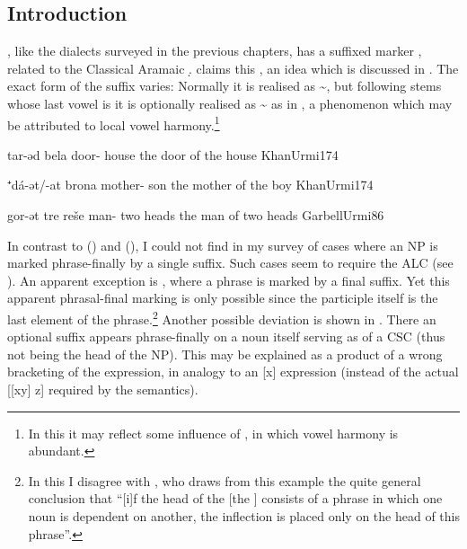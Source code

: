 \subsection{Introduction}
\JUrm, like the  dialects surveyed in the previous chapters, has a suffixed \cst* marker \ed, related to the Classical Aramaic \lnk* \d. \citet[171]{Garbell1965impact} claims this , an idea which is discussed in .   The exact form of the suffix varies: Normally it is realised as \~, but following stems whose last vowel is  it is optionally realised as \~ as in  \citep[174]{KhanUrmi}, a phenomenon which may be attributed to local vowel harmony.\footnote{In this it may reflect some influence of , in which vowel harmony is abundant.}

{tar-əd bela}
{door-\cst{} house}
{the door of the house}
{KhanUrmi}{174}

{⁺dá-ət/-at brona} 
{mother-\cst{} son}
{the mother of the boy}
{KhanUrmi}{174}

{gor-ət tre reše}
{man-\cst{} two heads}
{the man of two heads}
{GarbellUrmi}{86}

In contrast to \JZax () and \Qar (), I could not find in my survey of \JUrm  cases where an NP is marked phrase-finally by a single \ed suffix. Such cases seem to require the ALC (see ). An apparent exception is , where a  phrase is marked by a final \ed suffix. Yet this apparent phrasal-final marking is only possible since the participle itself is the last element of the phrase.\footnote{In this I disagree with \citet[230]{KhanUrmi}, who draws from this example the quite general conclusion that \enquote{[i]f the head of the  [the \prim] consists of a phrase in which one noun is dependent on another, the  inflection is placed only on the head of this phrase}.} Another possible deviation is shown in . There an optional \cst* suffix appears phrase-finally on a noun itself serving as \secn of a CSC (thus not being the head of the NP). This may be explained as a product of a wrong bracketing of the expression, in analogy to an [x\ed [y\ed z]] expression (instead of the actual [[x\ed y] z] required by the semantics).   

